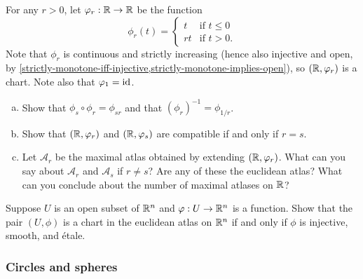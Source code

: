 \begin{exercise}
	For any $r > 0$, let $\varphi_r : \mathbb{R} \to \mathbb{R}$ be the function
	\[ \phi_r(t) = \begin{cases} t & \text{if } t \leq 0 \\ rt & \text{if } t > 0. \end{cases} \]
	Note that $\phi_r$ is continuous and strictly increasing (hence also injective and open, by \cref{strictly-monotone-iff-injective,strictly-monotone-implies-open}), so $(\mathbb{R}, \varphi_r)$ is a chart. Note also that $\varphi_1 = \mathrm{id}$. 
	\begin{enumerate}[(a)]
		\item Show that $\phi_s \circ \phi_r = \phi_{sr}$ and that $(\phi_r)^{-1} = \phi_{1/r}$. 
		\item Show that $(\mathbb{R}, \varphi_r)$ and $(\mathbb{R}, \varphi_s)$ are compatible if and only if $r = s$.
		\item Let $\mathscr{A}_r$ be the maximal atlas obtained by extending $(\mathbb{R}, \varphi_r)$. What can you say about $\mathscr{A}_r$ and $\mathscr{A}_s$ if $r \neq s$? Are any of these the euclidean atlas? What can you conclude about the number of maximal atlases on $\mathbb{R}$?
	\end{enumerate}  
\end{exercise}

\begin{exercise} \label{euclidean-chart-characterization}
	Suppose $U$ is an open subset of $\mathbb{R}^n$ and $\varphi : U \to \mathbb{R}^n$ is a function. Show that the pair $(U, \phi)$ is a chart in the euclidean atlas on $\mathbb{R}^n$ if and only if $\phi$ is injective, smooth, and \'etale.
\end{exercise}

\subsubsection*{Circles and spheres}

